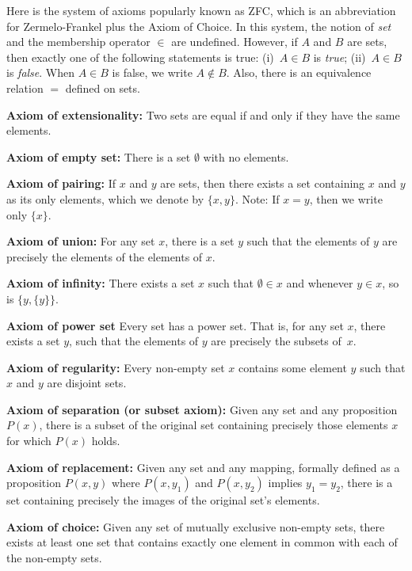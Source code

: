 Here is the system of axioms popularly known as ZFC, which
is an abbreviation for Zermelo-Frankel plus the Axiom of Choice.
In this system,
the notion of \textit{set} and the membership operator $\in$
are undefined.  However, if $A$ and $B$ are sets, then
exactly one of the following statements is true: 
(i)~$A\in B$ is \textit{true}; (ii)~$A\in B$ is \textit{false}.  
When $A\in B$ is false, we write $A\notin B$. Also, there 
is an equivalence relation $=$ defined on sets.

\medskip
\noindent
\textbf{Axiom of extensionality:}\quad
Two sets are equal if and only if they have the same elements. 
 
\medskip
\noindent
\textbf{Axiom of empty set:}\quad
There is a set $\emptyset$ with no elements. 
 
\medskip
\noindent
\textbf{Axiom of pairing:}\quad 
If $x$ and $y$ are sets, then there exists a set containing $x$ and $y$ 
as its only elements, which we denote by $\{x,y\}$.  Note: If
$x=y$, then we write only $\{x\}$.
 
\medskip
\noindent
\textbf{Axiom of union:}\quad 
For any set $x$, there is a set $y$ such that the elements of $y$ 
are precisely the elements of the elements of $x$. 
 
\medskip
\noindent
\textbf{Axiom of infinity:}\quad 
There exists a set $x$ such that $\emptyset\in x$ and whenever 
$y\in x$, so is $\{y ,\{y\}\}$. 
 
\medskip
\noindent
\textbf{Axiom of power set}\quad 
Every set has a power set. That is, for any set $x$, 
there exists a set $y$, such that the elements of $y$ are 
precisely the subsets of~$x$. 
 
\medskip
\noindent
\textbf{Axiom of regularity:}\quad 
Every non-empty set $x$ contains some element $y$ such that 
$x$ and $y$ are disjoint sets. 
 
\medskip
\noindent
\textbf{Axiom of separation (or subset axiom):}\quad 
Given any set and any proposition $P(x)$, there is a subset 
of the original set containing precisely those elements $x$ 
for which $P(x)$ holds. 
 
\medskip
\noindent
\textbf{Axiom of replacement:}\quad
Given any set and any mapping, formally defined as a 
proposition $P(x,y)$ where $P(x,y_1)$ and $P(x,y_2)$ implies 
$y_1 = y_2$, there is a set containing precisely the images 
of the original set's elements. 
 
\medskip
\noindent
\textbf{Axiom of choice:}\quad 
Given any set of mutually exclusive non-empty sets, there 
exists at least one set that contains exactly one element in 
common with each of the non-empty sets. 



